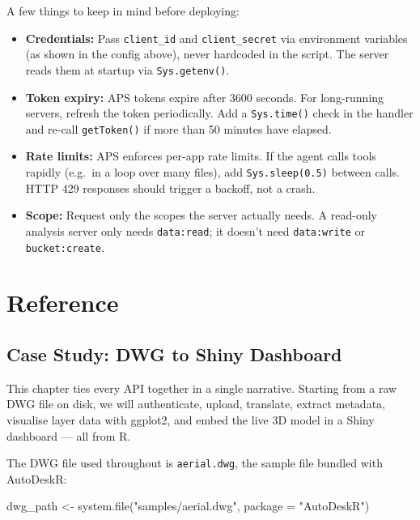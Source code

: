 \documentclass[
  11pt,
  letterpaper,
  DIV=11,
  numbers=noendperiod]{scrreprt}
\newenvironment{Shaded}{\begin{snugshade}}{\end{snugshade}}
\newcommand{\AttributeTok}[1]{\textcolor[rgb]{0.40,0.45,0.13}{#1}}
\newcommand{\FunctionTok}[1]{\textcolor[rgb]{0.28,0.35,0.67}{#1}}
\newcommand{\NormalTok}[1]{\textcolor[rgb]{0.00,0.23,0.31}{#1}}
\newcommand{\OtherTok}[1]{\textcolor[rgb]{0.00,0.23,0.31}{#1}}
\newcommand{\StringTok}[1]{\textcolor[rgb]{0.13,0.47,0.30}{#1}}
\providecommand{\tightlist}{%
  \setlength{\itemsep}{0pt}\setlength{\parskip}{0pt}}
\begin{document}
A few things to keep in mind before deploying:

\begin{itemize}
\tightlist
\item
  \textbf{Credentials:} Pass \texttt{client\_id} and
  \texttt{client\_secret} via environment variables (as shown in the
  config above), never hardcoded in the script. The server reads them at
  startup via \texttt{Sys.getenv()}.
\item
  \textbf{Token expiry:} APS tokens expire after 3600 seconds. For
  long-running servers, refresh the token periodically. Add a
  \texttt{Sys.time()} check in the handler and re-call
  \texttt{getToken()} if more than 50 minutes have elapsed.
\item
  \textbf{Rate limits:} APS enforces per-app rate limits. If the agent
  calls tools rapidly (e.g.~in a loop over many files), add
  \texttt{Sys.sleep(0.5)} between calls. HTTP 429 responses should
  trigger a backoff, not a crash.
\item
  \textbf{Scope:} Request only the scopes the server actually needs. A
  read-only analysis server only needs \texttt{data:read}; it doesn't
  need \texttt{data:write} or \texttt{bucket:create}.
\end{itemize}

\part{Reference}

\chapter{Case Study: DWG to Shiny
Dashboard}\label{case-study-dwg-to-shiny-dashboard}

This chapter ties every API together in a single narrative. Starting
from a raw DWG file on disk, we will authenticate, upload, translate,
extract metadata, visualise layer data with ggplot2, and embed the live
3D model in a Shiny dashboard --- all from R.

The DWG file used throughout is \texttt{aerial.dwg}, the sample file
bundled with AutoDeskR:

\begin{Shaded}
\begin{Highlighting}[]
\NormalTok{dwg\_path }\OtherTok{\textless{}{-}} \FunctionTok{system.file}\NormalTok{(}\StringTok{"samples/aerial.dwg"}\NormalTok{, }\AttributeTok{package =} \StringTok{"AutoDeskR"}\NormalTok{)}
\end{Highlighting}
\end{Shaded}
\end{document}
